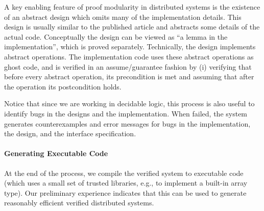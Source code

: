 {A key enabling feature of proof modularity in distributed systems is the existence of an abstract design which omits many of
the implementation details.
This design is usually similar to the published article and abstracts some details of the actual code.
Conceptually the design can be viewed as ``a lemma in the implementation'', which is proved separately.
Technically, the design implements abstract operations.
The implementation code uses these abstract operations as ghost code, and is verified in an assume/guarantee fashion by (i) verifying that before every abstract operation,
its precondition is met and assuming that after the operation its postcondition holds.

Notice that since we are working in decidable logic, this process is also useful to identify bugs in the designs and
the implementation.
When failed, the system generates counterexamples and error messages for bugs in the implementation, the design, and the
interface specification.


\paragraph{Generating Executable Code}
}

At the end of the process, we compile the verified system to executable code (which uses a small set of trusted libraries, e.g., to implement a built-in array type).
Our preliminary experience indicates that this can be used to generate reasonably efficient verified distributed systems.


